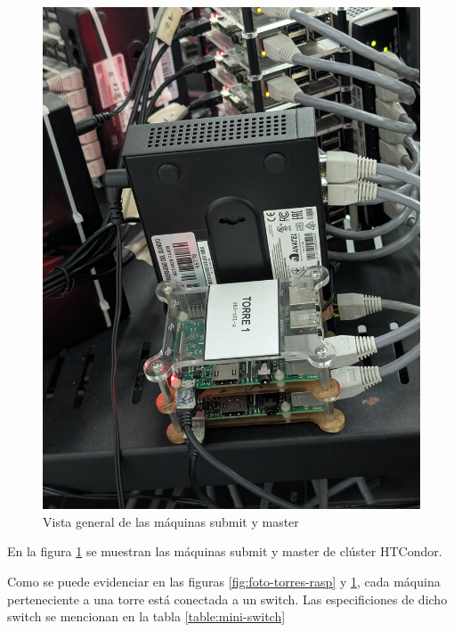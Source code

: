 \begin{figure}[H]
	\centering
	\includegraphics[scale=0.065]{tablas-images/raspberries/torre-binaria.jpeg}
	\caption{Vista general de las máquinas submit y master}
	\label{fig:foto-torre-binaria}
\end{figure}



\noindent
En la figura \ref{fig:foto-torre-binaria} se muestran las máquinas submit y master de clúster HTCondor.

\noindent
Como se puede evidenciar en las figuras \ref{fig:foto-torres-rasp} y \ref{fig:foto-torre-binaria}, cada máquina perteneciente a una torre está conectada a un switch. Las especificiones de dicho switch se mencionan en la tabla \ref{table:mini-switch}




